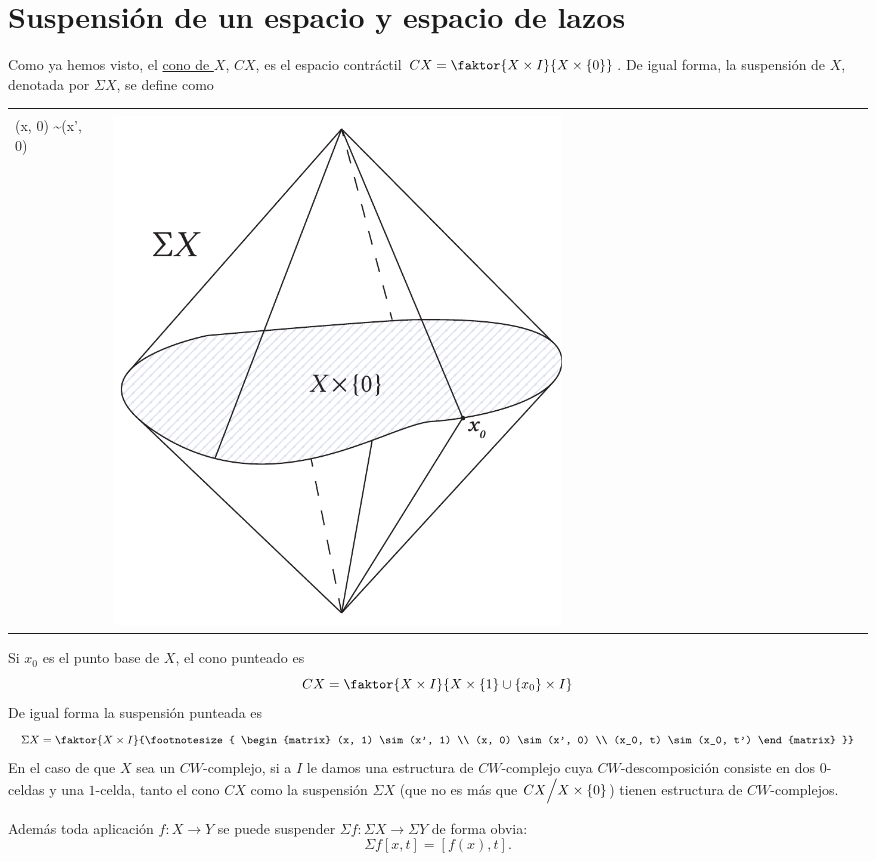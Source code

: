 \section{Suspensión de un espacio y espacio de lazos}
Como ya hemos visto, el \hyperlink{ecom:cono}{cono de $X$}, $CX$, es el espacio contráctil $CX = \faktor{X \times I }{X \times \{ 0 \}}$. De igual forma, la suspensión de $X$, denotada por $\Sigma X$, se define como \par 
\begin{tabular}{ll}
\begin{minipage}{0.5\textwidth}
\[ \Sigma X =  \faktor{X \times I}
{ \footnotesize{\begin{matrix}
(x, 1) \sim (x', 1) \\
(x, 0) \sim (x', 0)
\end{matrix}}} \] 
\end{minipage}
&
\begin{minipage}{0.5\textwidth}
\includegraphics[width=0.6\textwidth]{images/suspensionalt.pdf}
\end{minipage}
\end{tabular}
Si $x_0$ es el punto base de $X$, el cono punteado es
\[ CX = \faktor{X \times I}{X \times \{ 1 \}  \cup \{ x_0 \} \times I}\]
De igual forma la suspensión punteada es 
\[ \Sigma X = \faktor{ X \times I }
{\footnotesize{ \begin{matrix}
(x, 1) \sim (x', 1) \\ 
(x, 0) \sim (x', 0) \\ 
(x_0, t) \sim (x_0, t')
\end{matrix} }} \]
En el caso de que $X$ sea un $CW$-complejo, si a $I$ le damos una  estructura de $CW$-complejo cuya $CW$-descomposición consiste en dos $0$-celdas y una $1$-celda, tanto el cono $CX$ como la suspensión $\Sigma X$ (que no es más que $CX \Bign/ X \times \{ 0 \}$) tienen estructura de $CW$-complejos. \par
Además toda aplicación $f : X \longrightarrow Y$ se puede suspender $\Sigma f : \Sigma X \longrightarrow \Sigma Y$ de forma obvia:
\[\Sigma f [x, t] = [f(x), t]. \]

